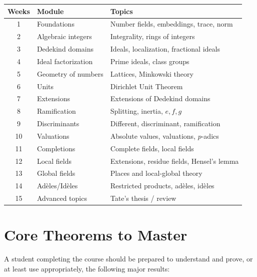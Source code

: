 \documentclass[11pt]{article}
\begin{document}
\begin{center}
\begin{tabular}{c l l}
\toprule
\textbf{Weeks} & \textbf{Module} & \textbf{Topics} \\
\midrule
1 & Foundations &
Number fields, embeddings, trace, norm \\
2 & Algebraic integers &
Integrality, rings of integers \\
3 & Dedekind domains &
Ideals, localization, fractional ideals \\
4 & Ideal factorization &
Prime ideals, class groups \\
5 & Geometry of numbers &
Lattices, Minkowski theory \\
6 & Units &
Dirichlet Unit Theorem \\
7 & Extensions &
Extensions of Dedekind domains \\
8 & Ramification &
Splitting, inertia, $e,f,g$ \\
9 & Discriminants &
Different, discriminant, ramification \\
10 & Valuations &
Absolute values, valuations, $p$-adics \\
11 & Completions &
Complete fields, local fields \\
12 & Local fields &
Extensions, residue fields, Hensel's lemma \\
13 & Global fields &
Places and local-global theory \\
14 & Adèles/Idèles &
Restricted products, adèles, idèles \\
15 & Advanced topics &
Tate's thesis / review \\
\bottomrule
\end{tabular}
\end{center}

\section{Core Theorems to Master}

A student completing the course should be prepared to understand
and prove, or at least use appropriately, the following major
results:
\end{document}

